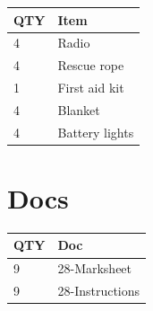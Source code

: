 \documentclass[10pt, A5]{article}
\begin{document}
\begin{framed}
\begin{minipage}{\textwidth}
\begin{multicols}{2}
		
	\begin{center}
			\begin{tabular}{p{2cm}p{4cm}}


				\textbf{QTY} & \textbf{Item} \\\toprule
												4&Radio\\\midrule
												4&Rescue rope\\\midrule
												1&First aid kit\\\midrule
												4&Blanket\\\midrule
												4&Battery lights\\\midrule
								\end{tabular}

			\end{center}

		
		\vfill\null
		\columnbreak

			\section*{\faFile \: Docs}
		 	\begin{center}
			\begin{tabular}{p{2cm}p{4cm}}

			\textbf{QTY} & \textbf{Doc} \\\toprule
										9&28-Marksheet\\\midrule
										9&28-Instructions\\\midrule
							\end{tabular}
			\end{center}
	

		\vfill\null

		\end{multicols}
\end{minipage}
\end{framed}
\end{document}
